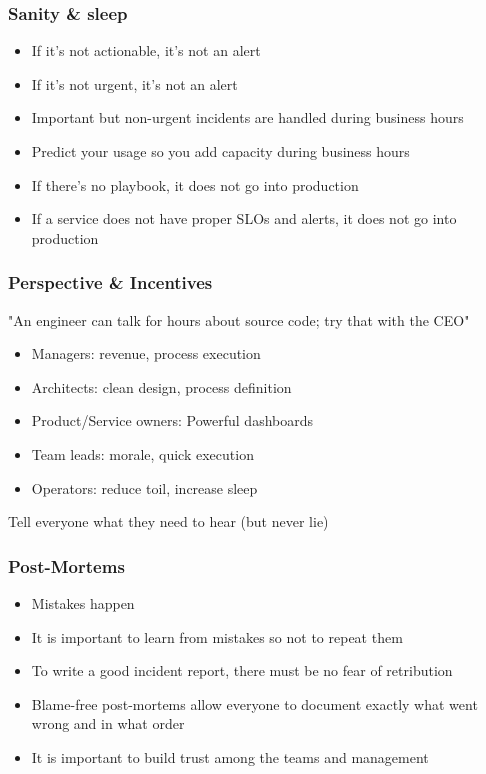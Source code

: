 \documentclass[t]{beamer}
\begin{document}
\begin{frame}
	\frametitle{Sanity \& sleep}
	\begin{itemize}
		\item If it's not actionable, it's not an alert
		\item If it's not urgent, it's not an alert
		\item Important but non-urgent incidents are handled during business hours
		\item Predict your usage so you add capacity during business hours
		\item If there's no playbook, it does not go into production
		\item If a service does not have proper SLOs and alerts, it does not go into production
	\end{itemize}
\end{frame}

\begin{frame}
	\frametitle{Perspective \& Incentives}
	"An engineer can talk for hours about source code; try that with the CEO"
	\vfill
	\begin{itemize}
		\item Managers: revenue, process execution
		\item Architects: clean design, process definition
		\item Product/Service owners: Powerful dashboards
		\item Team leads: morale, quick execution
		\item Operators: reduce toil, increase sleep
	\end{itemize}
	\vfill
	Tell everyone what they need to hear (but never lie)
	\vfill
\end{frame}


\begin{frame}
	\frametitle{Post-Mortems}
	\begin{itemize}
		\item Mistakes happen
		\item It is important to learn from mistakes so not to repeat them
		\item To write a good incident report, there must be no fear of retribution
		\item Blame-free post-mortems allow everyone to document exactly what went wrong and in what order
		\item It is important to build trust among the teams and management
	\end{itemize}
\end{frame}
\end{document}
